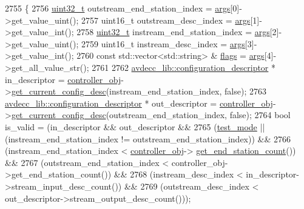 \begin{DoxyCode}
2755 \{
2756     \hyperlink{parse_8c_a6eb1e68cc391dd753bc8ce896dbb8315}{uint32\_t} outstream\_end\_station\_index = \hyperlink{namespaceastime__fitline_a8187411843a6284ffb964ef3fb9fcab3}{args}[0]->get\_value\_uint();
2757     uint16\_t outstream\_desc\_index = \hyperlink{namespaceastime__fitline_a8187411843a6284ffb964ef3fb9fcab3}{args}[1]->get\_value\_int();
2758     \hyperlink{parse_8c_a6eb1e68cc391dd753bc8ce896dbb8315}{uint32\_t} instream\_end\_station\_index = \hyperlink{namespaceastime__fitline_a8187411843a6284ffb964ef3fb9fcab3}{args}[2]->get\_value\_uint();
2759     uint16\_t instream\_desc\_index = \hyperlink{namespaceastime__fitline_a8187411843a6284ffb964ef3fb9fcab3}{args}[3]->get\_value\_int();
2760     \textcolor{keyword}{const} std::vector<std::string> & \hyperlink{namespaceavdecc__lib_ab6b306ef981f5e21bb41ea2c2dbe8cd9}{flags} = \hyperlink{namespaceastime__fitline_a8187411843a6284ffb964ef3fb9fcab3}{args}[4]->get\_all\_value\_str();
2761 
2762     \hyperlink{classavdecc__lib_1_1configuration__descriptor}{avdecc\_lib::configuration\_descriptor} * in\_descriptor = 
      \hyperlink{classcmd__line_af0a7784509e5bf1210a2aa19cea5df70}{controller\_obj}->\hyperlink{classavdecc__lib_1_1controller_af249ed146464b54d7fc9d87f67bcff46}{get\_current\_config\_desc}(instream\_end\_station\_index, \textcolor{keyword}{
      false});
2763     \hyperlink{classavdecc__lib_1_1configuration__descriptor}{avdecc\_lib::configuration\_descriptor} * out\_descriptor = 
      \hyperlink{classcmd__line_af0a7784509e5bf1210a2aa19cea5df70}{controller\_obj}->\hyperlink{classavdecc__lib_1_1controller_af249ed146464b54d7fc9d87f67bcff46}{get\_current\_config\_desc}(outstream\_end\_station\_index, \textcolor{keyword}{
      false});
2764     \textcolor{keywordtype}{bool} is\_valid = (in\_descriptor && out\_descriptor &&
2765                      (\hyperlink{classcmd__line_a07c66893ce868671f9998dad80094cb1}{test\_mode} || (instream\_end\_station\_index != outstream\_end\_station\_index)) &&
2766                      (instream\_end\_station\_index < \hyperlink{classcmd__line_af0a7784509e5bf1210a2aa19cea5df70}{controller\_obj}->
      \hyperlink{classavdecc__lib_1_1controller_ab5ddf7b4a9718fe3e821289141f44485}{get\_end\_station\_count}()) &&
2767                      (outstream\_end\_station\_index < controller\_obj->get\_end\_station\_count()) &&
2768                      (instream\_desc\_index < in\_descriptor->stream\_input\_desc\_count()) &&
2769                      (outstream\_desc\_index < out\_descriptor->stream\_output\_desc\_count()));

\end{DoxyCode}
